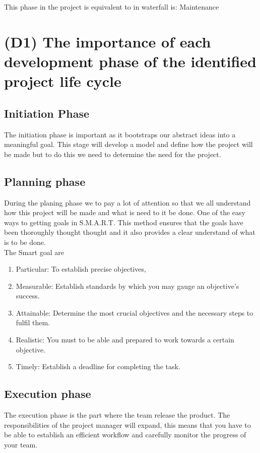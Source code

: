 \documentclass{article}
\begin{document}
This phase in the project is equivalent to in waterfall is: Maintenance

\break
\section{(D1) The importance of each development phase of the identified project life cycle}

\subsection{Initiation Phase}
The initiation phase is important as it bootstraps our abstract ideas into a meaningful goal. This stage will develop a model and define how the project will be made but to do this we need to determine the need for the project.




\subsection{Planning phase}
During the planing phase we to pay a lot of attention so that we all understand how this project will be made and what is need to it be done. One of the easy ways to getting goals in S.M.A.R.T. This method ensures that the goals have been thoroughly thought thought and it also provides a clear understand of what is to be done. \\

The Smart goal are
\begin{enumerate}
    \item Particular: To establish precise objectives,
    \item Measurable: Establish standards by which you may gauge an objective's success.
    \item Attainable: Determine the most crucial objectives and the necessary steps to fulfil them.
    \item Realistic: You must to be able and prepared to work towards a certain objective.
    \item Timely: Establish a deadline for completing the task.
\end{enumerate}


\subsection{Execution phase}
The execution phase is the part where the team release the product. The responsibilities of the project manager will expand, this means that you have to be able to establish an efficient workflow and carefully monitor the progress of your team. 
\end{document}
